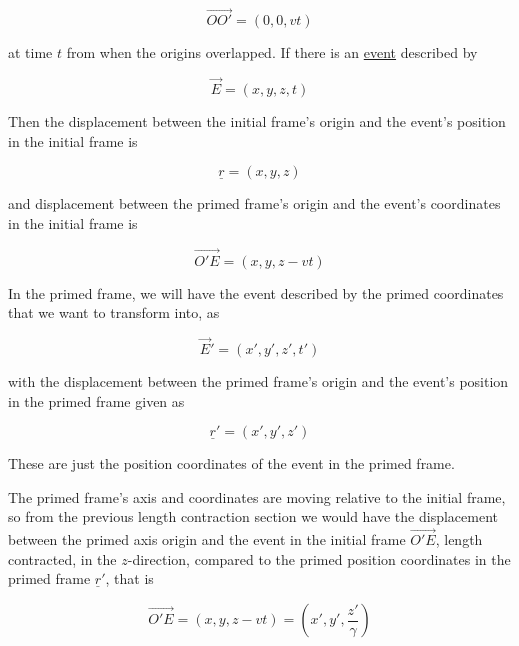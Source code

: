 \begin{equation}
	\vec{OO{'}} = (0,0,{v}{t})
\end{equation}

at time ${t}$ from when the origins overlapped.
If there is an \hyperlink{def-event}{event} described by

\begin{equation}
	\vec{E} = ({x},{y},{z},{t})
\end{equation}

Then the displacement between the initial frame's origin and the event's position in the initial frame is

\begin{equation}
	\underline{r} = ({x},{y},{z})
\end{equation}

and displacement between the primed frame's origin and the event's coordinates in the initial frame is

\begin{equation}
	\vec{O'E} = ({x},{y},{z}-{v}{t})
\end{equation}

In the primed frame, we will have the event described by the primed coordinates that we want to transform into, as

\begin{equation}
	\vec{E}' = ({x{'}},{y{'}},{z{'}},t{'})
\end{equation}

with the displacement between the primed frame's origin and the event's position in the primed frame given as

\begin{equation}
	{\underline{r}{'}} = ({x{'}},{y{'}},{z{'}})
\end{equation}

These are just the position coordinates of the event in the primed frame.

The primed frame's axis and coordinates are moving relative to the initial frame, so from the previous length contraction section we would have the displacement between the primed axis origin and the event in the initial frame $\vec{O'E}$, length contracted, in the $z$-direction, compared to the primed position coordinates in the primed frame ${\underline{r}{'}}$, that is

\begin{equation}
	\vec{O'E} = ({x},{y},{z}-{v}{t}) = ({x{'}},{y{'}},\frac{z{'}}{\gamma})
\end{equation}

